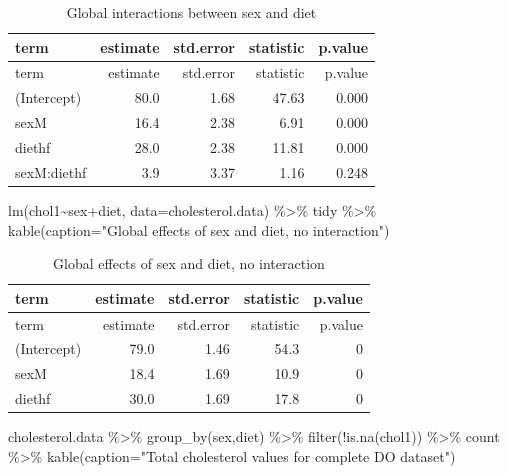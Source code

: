 \documentclass[
]{article}
\newenvironment{Shaded}{\begin{snugshade}}{\end{snugshade}}
\newcommand{\AttributeTok}[1]{\textcolor[rgb]{0.77,0.63,0.00}{#1}}
\newcommand{\FunctionTok}[1]{\textcolor[rgb]{0.00,0.00,0.00}{#1}}
\newcommand{\NormalTok}[1]{#1}
\newcommand{\SpecialCharTok}[1]{\textcolor[rgb]{0.00,0.00,0.00}{#1}}
\newcommand{\StringTok}[1]{\textcolor[rgb]{0.31,0.60,0.02}{#1}}
\begin{document}
\begin{longtable}[]{@{}lrrrr@{}}
\caption{Global interactions between sex and diet}\tabularnewline
\toprule()
term & estimate & std.error & statistic & p.value \\
\midrule()
\endfirsthead
\toprule()
term & estimate & std.error & statistic & p.value \\
\midrule()
\endhead
(Intercept) & 80.0 & 1.68 & 47.63 & 0.000 \\
sexM & 16.4 & 2.38 & 6.91 & 0.000 \\
diethf & 28.0 & 2.38 & 11.81 & 0.000 \\
sexM:diethf & 3.9 & 3.37 & 1.16 & 0.248 \\
\bottomrule()
\end{longtable}

\begin{Shaded}
\begin{Highlighting}[]
\FunctionTok{lm}\NormalTok{(chol1}\SpecialCharTok{\textasciitilde{}}\NormalTok{sex}\SpecialCharTok{+}\NormalTok{diet, }\AttributeTok{data=}\NormalTok{cholesterol.data) }\SpecialCharTok{\%\textgreater{}\%}
\NormalTok{  tidy }\SpecialCharTok{\%\textgreater{}\%}
  \FunctionTok{kable}\NormalTok{(}\AttributeTok{caption=}\StringTok{"Global effects of sex and diet, no interaction"}\NormalTok{)}
\end{Highlighting}
\end{Shaded}

\begin{longtable}[]{@{}lrrrr@{}}
\caption{Global effects of sex and diet, no interaction}\tabularnewline
\toprule()
term & estimate & std.error & statistic & p.value \\
\midrule()
\endfirsthead
\toprule()
term & estimate & std.error & statistic & p.value \\
\midrule()
\endhead
(Intercept) & 79.0 & 1.46 & 54.3 & 0 \\
sexM & 18.4 & 1.69 & 10.9 & 0 \\
diethf & 30.0 & 1.69 & 17.8 & 0 \\
\bottomrule()
\end{longtable}

\begin{Shaded}
\begin{Highlighting}[]
\NormalTok{cholesterol.data }\SpecialCharTok{\%\textgreater{}\%}
  \FunctionTok{group\_by}\NormalTok{(sex,diet) }\SpecialCharTok{\%\textgreater{}\%}
  \FunctionTok{filter}\NormalTok{(}\SpecialCharTok{!}\FunctionTok{is.na}\NormalTok{(chol1)) }\SpecialCharTok{\%\textgreater{}\%}
\NormalTok{  count }\SpecialCharTok{\%\textgreater{}\%}
  \FunctionTok{kable}\NormalTok{(}\AttributeTok{caption=}\StringTok{"Total cholesterol values for complete DO dataset"}\NormalTok{)}
\end{Highlighting}
\end{Shaded}
\end{document}
